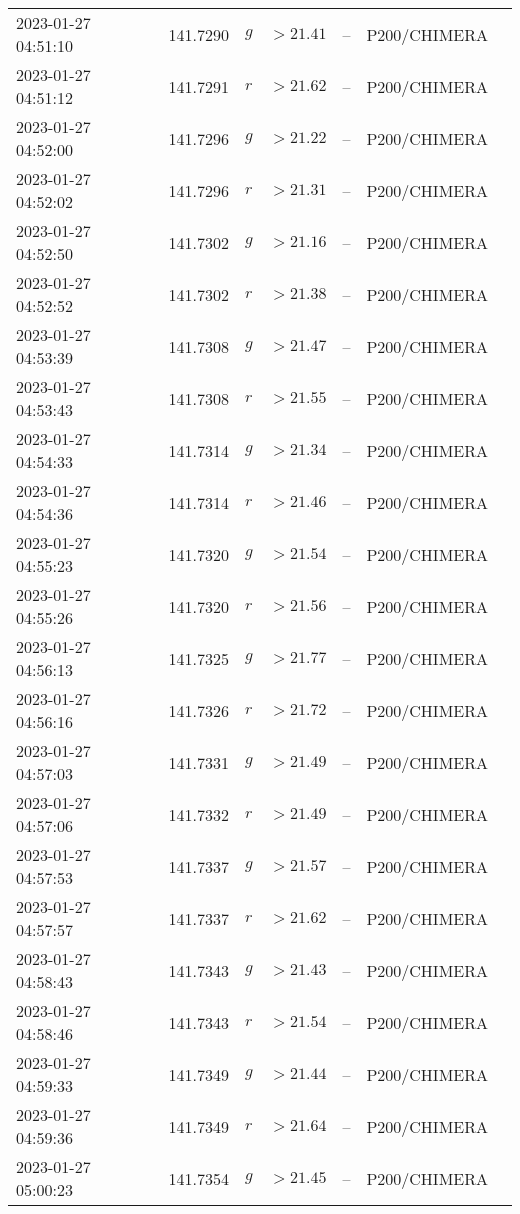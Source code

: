 \documentclass{nature_plusfigure}
\begin{document}
\begin{supplement}
\begin{center}
\begin{longtable}{lllllll}
2023-01-27 04:51:10 & 141.7290 & $g$ & $>21.41$ & -- & P200/CHIMERA &  \\ 
2023-01-27 04:51:12 & 141.7291 & $r$ & $>21.62$ & -- & P200/CHIMERA &  \\ 
2023-01-27 04:52:00 & 141.7296 & $g$ & $>21.22$ & -- & P200/CHIMERA &  \\ 
2023-01-27 04:52:02 & 141.7296 & $r$ & $>21.31$ & -- & P200/CHIMERA &  \\ 
2023-01-27 04:52:50 & 141.7302 & $g$ & $>21.16$ & -- & P200/CHIMERA &  \\ 
2023-01-27 04:52:52 & 141.7302 & $r$ & $>21.38$ & -- & P200/CHIMERA &  \\ 
2023-01-27 04:53:39 & 141.7308 & $g$ & $>21.47$ & -- & P200/CHIMERA &  \\ 
2023-01-27 04:53:43 & 141.7308 & $r$ & $>21.55$ & -- & P200/CHIMERA &  \\ 
2023-01-27 04:54:33 & 141.7314 & $g$ & $>21.34$ & -- & P200/CHIMERA &  \\ 
2023-01-27 04:54:36 & 141.7314 & $r$ & $>21.46$ & -- & P200/CHIMERA &  \\ 
2023-01-27 04:55:23 & 141.7320 & $g$ & $>21.54$ & -- & P200/CHIMERA &  \\ 
2023-01-27 04:55:26 & 141.7320 & $r$ & $>21.56$ & -- & P200/CHIMERA &  \\ 
2023-01-27 04:56:13 & 141.7325 & $g$ & $>21.77$ & -- & P200/CHIMERA &  \\ 
2023-01-27 04:56:16 & 141.7326 & $r$ & $>21.72$ & -- & P200/CHIMERA &  \\ 
2023-01-27 04:57:03 & 141.7331 & $g$ & $>21.49$ & -- & P200/CHIMERA &  \\ 
2023-01-27 04:57:06 & 141.7332 & $r$ & $>21.49$ & -- & P200/CHIMERA &  \\ 
2023-01-27 04:57:53 & 141.7337 & $g$ & $>21.57$ & -- & P200/CHIMERA &  \\ 
2023-01-27 04:57:57 & 141.7337 & $r$ & $>21.62$ & -- & P200/CHIMERA &  \\ 
2023-01-27 04:58:43 & 141.7343 & $g$ & $>21.43$ & -- & P200/CHIMERA &  \\ 
2023-01-27 04:58:46 & 141.7343 & $r$ & $>21.54$ & -- & P200/CHIMERA &  \\ 
2023-01-27 04:59:33 & 141.7349 & $g$ & $>21.44$ & -- & P200/CHIMERA &  \\ 
2023-01-27 04:59:36 & 141.7349 & $r$ & $>21.64$ & -- & P200/CHIMERA &  \\ 
2023-01-27 05:00:23 & 141.7354 & $g$ & $>21.45$ & -- & P200/CHIMERA &  \\ 

\end{longtable}
\end{center}
\end{supplement}
\end{document}
